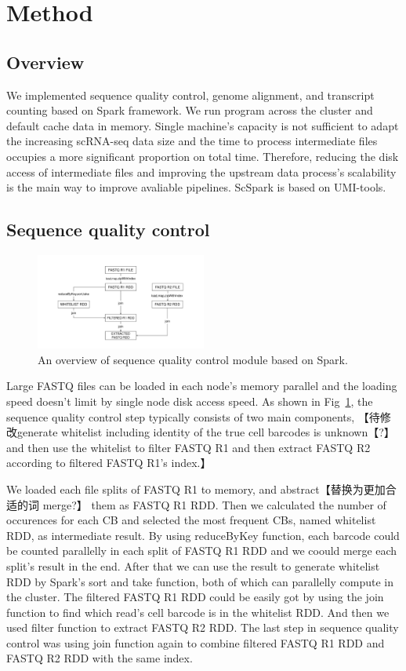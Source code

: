 \documentclass[conference]{IEEEtran}
\begin{document}
\section{Method}
\subsection{Overview}
We implemented sequence quality control, genome alignment, and transcript counting based on Spark framework. 
We run program across the cluster and default cache data in memory. 
Single machine's capacity is not sufficient to adapt the increasing scRNA-seq data size and the time to process intermediate files occupies a more significant proportion on total time. 
Therefore, reducing the disk access of intermediate files and improving the upstream data process's scalability is the main way to improve avaliable pipelines. 
ScSpark is based on UMI-tools.
\subsection{Sequence quality control}
\begin{figure}
  \includegraphics[width=0.5\textwidth]{fig1.pdf}
  \caption{An overview of sequence quality control module based on Spark.} \label{fig1}
\end{figure} 

Large FASTQ files can be loaded in each node's memory parallel and the loading speed doesn't limit by single node disk access speed. 
As shown in Fig~\ref{fig1}, the sequence quality control step typically consists of two main components, 【待修改generate whitelist including identity of the true cell barcodes is unknown【?】 and then use the whitelist to filter FASTQ R1 and then extract FASTQ R2 according to filtered FASTQ R1's index.】

We loaded each file splits of FASTQ R1 to memory, and abstract【替换为更加合适的词 merge?】 them as FASTQ R1 RDD. 
Then we calculated the number of occurences for each CB and selected the most frequent CBs, named whitelist RDD, as intermediate result. 
By using reduceByKey function, each barcode could be counted parallelly in each split of FASTQ R1 RDD and we coould merge each split's result in the end. 
After that we can use the result to generate whitelist RDD by Spark's sort and take function, both of which can parallelly compute in the cluster. 
The filtered FASTQ R1 RDD could be easily got by using the join function to find which read's cell barcode is in the whitelist RDD. 
And then we used filter function to extract FASTQ R2 RDD. 
The last step in sequence quality control was using join function again to combine filtered FASTQ R1 RDD and FASTQ R2 RDD with the same index. 
\end{document}
